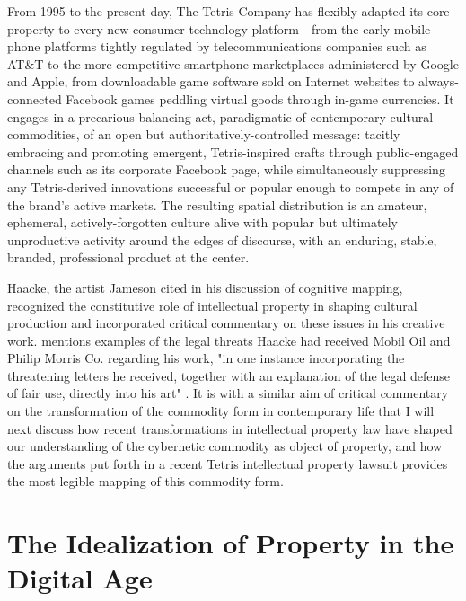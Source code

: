 From 1995 to the present day, The Tetris Company has flexibly adapted its core property to every new consumer technology platform---from the early mobile phone platforms tightly regulated by telecommunications companies such as AT\&T to the more competitive smartphone marketplaces administered by Google and Apple, from downloadable game software sold on Internet websites to always-connected Facebook games peddling virtual goods through in-game currencies. It engages in a precarious balancing act, paradigmatic of contemporary cultural commodities, of an open but authoritatively-controlled message: tacitly embracing and promoting emergent, Tetris-inspired crafts through public-engaged channels such as its corporate Facebook page, while simultaneously suppressing any Tetris-derived innovations successful or popular enough to compete in any of the brand's active markets. The resulting spatial distribution is an amateur, ephemeral, actively-forgotten culture alive with popular but ultimately unproductive activity around the edges of discourse, with an enduring, stable, branded, professional product at the center.

Haacke, the artist Jameson cited in his discussion of cognitive mapping, recognized the constitutive role of intellectual property in shaping cultural production and incorporated critical commentary on these issues in his creative work. \citeauthor{Coombe1998-yv} mentions examples of the legal threats Haacke had received Mobil Oil and Philip Morris Co. regarding his work, "in one instance incorporating the threatening letters he received, together with an explanation of the legal defense of fair use, directly into his art" \autocite[74]{Coombe1998-yv}. It is with a similar aim of critical commentary on the transformation of the commodity form in contemporary life that I will next discuss how recent transformations in intellectual property law have shaped our understanding of the cybernetic commodity as object of property, and how the arguments put forth in a recent Tetris intellectual property lawsuit provides the most legible mapping of this commodity form.

\section{The Idealization of Property in the Digital Age}

